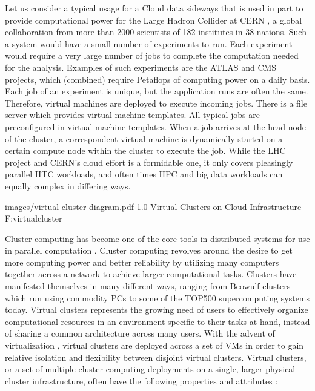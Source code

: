Let us consider a typical usage for a Cloud data sideways that is used in part to provide computational power for the Large Hadron Collider at CERN \cite{CERN2003}, a global collaboration from more than 2000 scientists of 182 institutes in 38 nations.  Such a system would have a small number of experiments to run. Each experiment would require a very large number of jobs to complete the computation needed for the analysis.  Examples of such experiments are the ATLAS \cite{luo2005gsp} and CMS \cite{cms} projects, which (combined) require Petaflops of computing power on a daily basis.  Each job of an experiment is unique, but the application runs are often the same.  Therefore, virtual machines are deployed to execute incoming jobs. There is a file server which provides virtual machine templates. All typical jobs are preconfigured in virtual machine templates. When a job arrives at the head node of the  cluster, a correspondent virtual machine is dynamically started on a certain compute node within the cluster to execute the job.  While the LHC project and CERN's cloud effort is a formidable one, it only covers pleasingly parallel HTC workloads, and often times HPC and big data workloads can equally complex in differing ways.


  {images/virtual-cluster-diagram.pdf}
  {1.0}
  {Virtual Clusters on Cloud Infrastructure}
  {F:virtualcluster}


Cluster computing has become one of the core tools in distributed systems for use in parallel computation \cite{amdahl1967validity}. Cluster computing revolves around the desire to get more computing power and better reliability by utilizing many computers together across a network to achieve larger computational tasks. Clusters have manifested themselves in many different ways, ranging from Beowulf clusters \cite{becker1995beowulf} which run using commodity PCs to some of the TOP500 \cite{www-top500} supercomputing systems today.  Virtual clusters represents the growing need of users to effectively organize computational resources in an environment specific to their tasks at hand, instead of sharing a common architecture across many users. With the advent of virtualization \cite{barham2003xen}, virtual clusters are deployed across a set of VMs in order to gain relative isolation and flexibility between disjoint virtual clusters. Virtual clusters, or a set of multiple cluster computing deployments on a single, larger physical cluster infrastructure, often have the following properties and attributes \cite{hwang2013distributed}:

